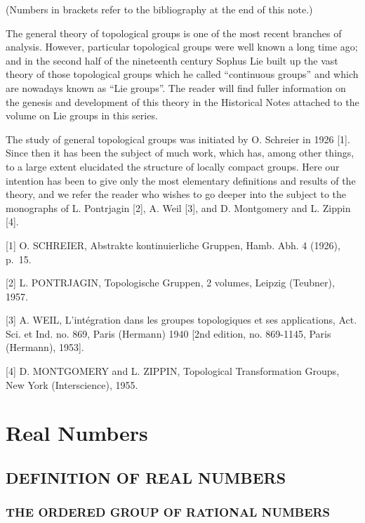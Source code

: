 
(Numbers in brackets refer to the bibliography at the end of this note.)

The general theory of topological groups is one of the most recent branches of analysis. However, particular topological groups were well known a long time ago; and in the second half of the nineteenth century Sophus Lie built up the vast theory of those topological groups which he called ``continuous groups'' and which are nowadays known as ``Lie groups''. The reader will find fuller information on the genesis and development of this theory in the Historical Notes attached to the volume on Lie groups in this series.

The study of general topological groups was initiated by O. Schreier in 1926 {[}1{]}. Since then it has been the subject of much work, which has, among other things, to a large extent elucidated the structure of locally compact groups. Here our intention has been to give only the most elementary definitions and results of the theory, and we refer the reader who wishes to go deeper into the subject to the monographs of L. Pontrjagin {[}2{]}, A. Weil {[}3{]}, and D. Montgomery and L. Zippin {[}4{]}.


{[}1{]} O. SCHREIER, Abstrakte kontinuierliche Gruppen, Hamb. Abh. 4 (1926), p.~15.

{[}2{]} L. PONTRJAGIN, Topologische Gruppen, 2 volumes, Leipzig (Teubner), 1957.

{[}3{]} A. WEIL, L'intégration dans les groupes topologiques et ses applications, Act. Sci. et Ind. no. 869, Paris (Hermann) 1940 {[}2nd edition, no. 869-1145, Paris (Hermann), 1953{]}.

{[}4{]} D. MONTGOMERY and L. ZIPPIN, Topological Transformation Groups, New York (Interscience), 1955.

\chapter{Real Numbers}

\section{DEFINITION OF REAL NUMBERS}

\subsection{THE ORDERED GROUP OF RATIONAL NUMBERS}

